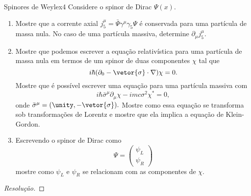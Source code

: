 \begin{exercício}{Spinores de Weyl}{ex4}
    Considere o spinor de Dirac \(\Psi(x)\).
    \begin{enumerate}[label=(\alph*)]
        \item Mostre que a corrente axial \(j_5^\mu = \bar{\Psi} \gamma^\mu \gamma_5 \Psi\) é conservada para uma partícula de massa nula. No caso de uma partícula massiva, determine \(\partial_\mu j^\mu_5.\)
        \item Mostre que podemos escrever a equação relativística para uma partícula de massa nula em termos de um spinor de duas componentes \(\chi\) tal que
            \begin{equation*}
                i\hbar (\partial_0 - \vetor{\sigma}\cdot \nabla) \chi = 0.
            \end{equation*}
            Mostre que é possível escrever uma equação para uma partícula massiva com
            \begin{equation*}
                i\hbar \bar{\sigma}^\mu \partial_\mu \chi - imc \sigma^2 \chi^* = 0,
            \end{equation*}
            onde \(\bar{\sigma}^\mu = (\unity, - \vetor{\sigma}).\) Mostre como essa equação se transforma sob transformações de Lorentz e mostre que ela implica a equação de Klein-Gordon.
        \item Escrevendo o spinor de Dirac como
            \begin{equation*}
                \Psi = \begin{pmatrix}
                    \psi_L\\
                    \psi_R
                \end{pmatrix}
            \end{equation*}
            mostre como \(\psi_L\) e \(\psi_R\) se relacionam com as componentes de \(\chi.\)
    \end{enumerate}
\end{exercício}
\begin{proof}[Resolução]
    
\end{proof}
